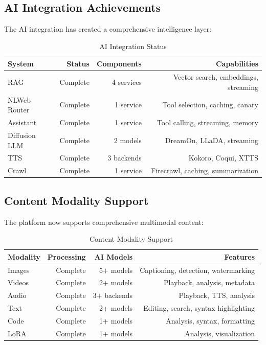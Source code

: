 \documentclass[11pt]{article}
\begin{document}
\subsection{AI Integration Achievements}

The AI integration has created a comprehensive intelligence layer:

\begin{table}[ht]
\centering
\begin{tabular}{|l|r|r|r|}
\hline
\textbf{System} & \textbf{Status} & \textbf{Components} & \textbf{Capabilities} \\
\hline
RAG & Complete & 4 services & Vector search, embeddings, streaming \\
NLWeb Router & Complete & 1 service & Tool selection, caching, canary \\
Assistant & Complete & 1 service & Tool calling, streaming, memory \\
Diffusion LLM & Complete & 2 models & DreamOn, LLaDA, streaming \\
TTS & Complete & 3 backends & Kokoro, Coqui, XTTS \\
Crawl & Complete & 1 service & Firecrawl, caching, summarization \\
\hline
\end{tabular}
\caption{AI Integration Status}
\label{table:ai-integration}
\end{table}

\subsection{Content Modality Support}

The platform now supports comprehensive multimodal content:

\begin{table}[ht]
\centering
\begin{tabular}{|l|r|r|r|}
\hline
\textbf{Modality} & \textbf{Processing} & \textbf{AI Models} & \textbf{Features} \\
\hline
Images & Complete & 5+ models & Captioning, detection, watermarking \\
Videos & Complete & 2+ models & Playback, analysis, metadata \\
Audio & Complete & 3+ backends & Playback, TTS, analysis \\
Text & Complete & 2+ models & Editing, search, syntax highlighting \\
Code & Complete & 1+ models & Analysis, syntax, formatting \\
LoRA & Complete & 1+ models & Analysis, visualization \\
\hline
\end{tabular}
\caption{Content Modality Support}
\label{table:modality-support}
\end{table}
\end{document}

